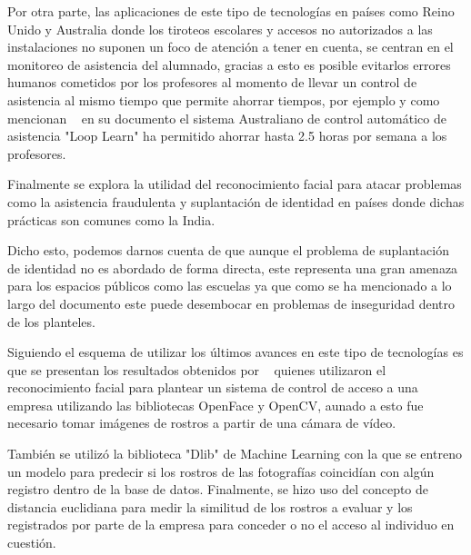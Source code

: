 Por otra parte, las aplicaciones de este tipo de tecnologías en países como Reino Unido y Australia donde los tiroteos escolares y accesos no autorizados a las instalaciones no suponen un foco de atención a tener en cuenta, se centran en el monitoreo de asistencia del alumnado, gracias a esto es posible evitarlos errores humanos cometidos por los profesores al momento de llevar un control de asistencia al mismo tiempo que permite ahorrar tiempos, por ejemplo y como mencionan ~\cite{FacialR} en su documento el sistema Australiano de control automático de asistencia "Loop Learn" ha permitido ahorrar hasta 2.5 horas por semana a los profesores.

Finalmente se explora la utilidad del reconocimiento facial para atacar problemas como la asistencia fraudulenta y suplantación de identidad en países donde dichas prácticas son comunes como la India.

Dicho esto, podemos darnos cuenta de que aunque el problema de suplantación de identidad no es abordado de forma directa, este representa una gran amenaza para los espacios públicos como las escuelas ya que como se ha mencionado a lo largo del documento este puede desembocar en problemas de inseguridad dentro de los planteles.

Siguiendo el esquema de utilizar los últimos avances en este tipo de tecnologías es que se presentan los resultados obtenidos por ~\cite{RecFacPython} quienes utilizaron el reconocimiento facial para plantear un sistema de control de acceso a una empresa utilizando las bibliotecas OpenFace y OpenCV, aunado a esto fue necesario tomar imágenes de rostros a partir de una cámara de vídeo.

También se utilizó la biblioteca "Dlib" de Machine Learning con la que se entreno un modelo para predecir si los rostros de las fotografías coincidían con algún registro dentro de la base de datos. Finalmente, se hizo uso del concepto de distancia euclidiana para medir la similitud de los rostros a evaluar y los registrados por parte de la empresa para conceder o no el acceso al individuo en cuestión.



